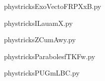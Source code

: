     

    \clearpage
    


    \newcommand{\CaptionFigExoVectoFRPXxB}{<+Type your caption here+>}
    \begin{center}
        
    \end{center}
    phystricksExoVectoFRPXxB.py

    

    \clearpage
    


    \newcommand{\CaptionFigILauamX}{<+Type your caption here+>}
    \begin{center}
        
    \end{center}
    phystricksILauamX.py

    

    \clearpage
    


    \newcommand{\CaptionFigZCumAwy}{<+Type your caption here+>}
    \begin{center}
        
    \end{center}
    phystricksZCumAwy.py

    

    \clearpage
    


    \newcommand{\CaptionFigParabolesfTKFw}{<+Type your caption here+>}
    \begin{center}
        
    \end{center}
    phystricksParabolesfTKFw.py

    

    \clearpage
    


    \newcommand{\CaptionFigPUGmLBC}{<+Type your caption here+>}
    \begin{center}
        
    \end{center}
    phystricksPUGmLBC.py

    

    \clearpage
    


